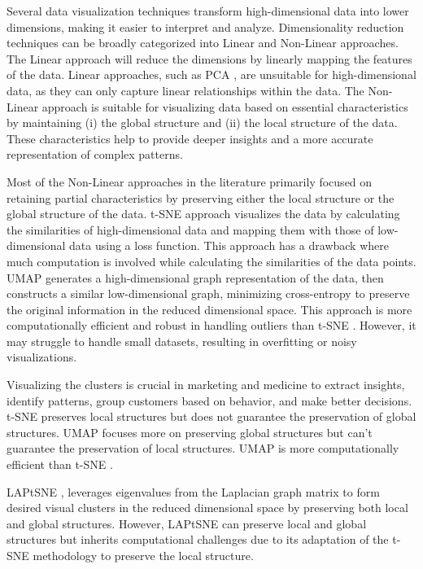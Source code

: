 Several data visualization techniques \cite{belkin2003laplacian,sammon1969nonlinear,Hinton2002,tsne,umap_reference,roweis2000nonlinear} transform high-dimensional data into lower dimensions, making it easier to interpret and analyze. Dimensionality reduction techniques can be broadly categorized into Linear and Non-Linear approaches. The Linear approach will reduce the dimensions by linearly mapping the features of the data. Linear approaches, such as PCA \cite{jolliffe2002principal}, are unsuitable for high-dimensional data, as they can only capture linear relationships within the data. The Non-Linear approach is suitable for visualizing data based on essential characteristics by maintaining (i) the global structure and (ii) the local structure of the data. These characteristics help to provide deeper insights and a more accurate representation of complex patterns.

Most of the Non-Linear approaches \cite{tsne} \cite{umap_reference} in the literature primarily focused on retaining partial characteristics by preserving either the local structure or the global structure of the data. t-SNE \cite{tsne} approach visualizes the data by calculating the similarities of high-dimensional data and mapping them with those of low-dimensional data using a loss function. This approach has a drawback where much computation is involved while calculating the similarities of the data points.  UMAP \cite{umap_reference} generates a high-dimensional graph representation of the data, then constructs a similar low-dimensional graph, minimizing cross-entropy to preserve the original information in the reduced dimensional space.  This approach is more computationally efficient and robust in handling outliers than t-SNE \cite{tsne}. However, it may struggle to handle small datasets, resulting in overfitting or noisy visualizations.

Visualizing the clusters is crucial in marketing and medicine to extract insights, identify patterns,  group customers based on behavior, and make better decisions. t-SNE \cite{tsne} preserves local structures but does not guarantee the preservation of global structures. UMAP \cite{umap_reference} focuses more on preserving global structures but can't guarantee the preservation of local structures. UMAP \cite{umap_reference} is more computationally efficient than t-SNE \cite{tsne}. 

LAPtSNE \cite{sun2023laplacian}, leverages eigenvalues from the Laplacian graph matrix to form desired visual clusters in the reduced dimensional space by preserving both local and global structures. However, LAPtSNE \cite{sun2023laplacian} can preserve local and global structures but inherits computational challenges due to its adaptation of the t-SNE \cite{tsne} methodology to preserve the local structure. 





